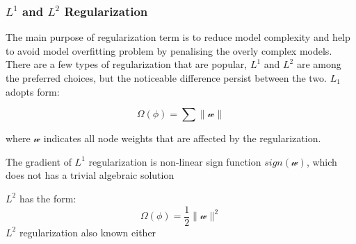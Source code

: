 \subsubsection{$L^1$ and $L^2$ Regularization}

The main purpose of regularization term is to reduce model complexity and help to avoid model overfitting problem by penalising the overly complex models. There are a few types of regularization that are popular, $L^1$ and $L^2$ are among the preferred choices, but the noticeable difference persist between the two. $L_1$ adopts form:

\begin{equation}
   \Omega(\phi) = \sum \parallel \mathcal{w} \parallel
\end{equation}

where $\mathcal{w}$ indicates all node weights that are affected by the regularization. 
\par 
The gradient of $L^1$ regularization is non-linear sign function $sign (\mathcal{w})$, which does not has a trivial algebraic solution

$L^2$ has the form:
\begin{equation}
   \Omega(\phi) = \frac {1}{2} \parallel \mathcal{w} \parallel^2
\end{equation}
$L^2$ regularization also known either 